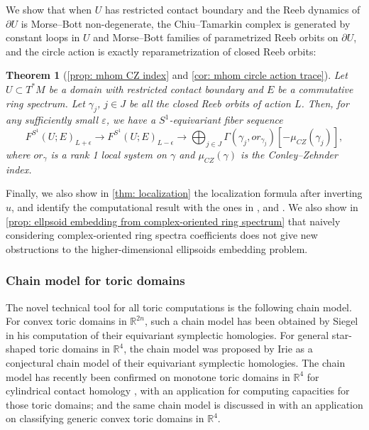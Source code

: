 \documentclass[11pt]{amsart}
\numberwithin{equation}{section}
\theoremstyle{plain}
\newtheorem{Thm}{Theorem}[section]
\theoremstyle{definition}
\theoremstyle{remark}
\newcommand{\bR} { {\mathbb{R}}}
\begin{document}
We show that when $U$ has restricted contact boundary and the Reeb dynamics of $\partial U$ is Morse--Bott non-degenerate, the Chiu--Tamarkin complex is generated by constant loops in $U$ and Morse--Bott families of parametrized Reeb orbits on $\partial U$, and the circle action is exactly reparametrization of closed Reeb orbits:

\begin{Thm}[{\autoref{prop: mhom CZ index} and \autoref{cor: mhom circle action trace}}]
    Let $U \subset T^*M$ be a domain with restricted contact boundary and $E$ be a commutative ring spectrum. Let $\gamma_j$, $j\in J$ be all the closed Reeb orbits of action $L$. Then, for any sufficiently small $\varepsilon$, we have a $S^1$-equivariant fiber sequence
    \[F^{S^1}(U; E)_{L+\epsilon} \to F^{S^1}(U; E)_{L-\epsilon} \to \bigoplus_{j\in J}\Gamma(\gamma_j, or_{\gamma_j})[-\mu_{CZ}(\gamma_j)],\]
    where $or_{\gamma}$ is a rank 1 local system on $\gamma$ and $\mu_{CZ}(\gamma)$ is the Conley--Zehnder index.
\end{Thm}

Finally, we also show in \autoref{thm: localization} the localization formula after inverting $u$, and identify the computational result with the ones in \cite{zhaoperiodic}, \cite{AlbersCieliebakFrauenfelder2016} and \cite{CoteKartal24}. We also show in \autoref{prop: ellpsoid embedding from complex-oriented ring spectrum} that naively considering complex-oriented ring spectra coefficients does not give new obstructions to the higher-dimensional ellipsoids embedding problem.

\subsubsection{Chain model for toric domains}
The novel technical tool for all toric computations is the following chain model. For convex toric domains in $\bR^{2n}$, such a chain model has been obtained by Siegel \cite{CompSiegelHigherCapacities} in his computation of their equivariant symplectic homologies. For general star-shaped toric domains in $\bR^4$, the chain model was proposed by Irie \cite{Irie_ChainModel} as a conjectural chain model of their equivariant symplectic homologies. The chain model has recently been confirmed on monotone toric domains in $\bR^4$ for cylindrical contact homology \cite{liang2026monotone}, with an application for computing capacities for those toric domains; and the same chain model is discussed in \cite{HutchingsConvexYoutube} with an application on classifying generic convex toric domains in $\bR^4$.
\end{document}
